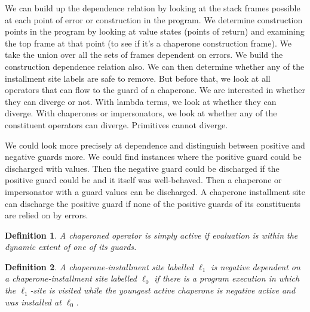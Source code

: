 \documentclass{sigplanconf}
\newtheorem{definition}{Definition}
\begin{document}
We can build up the dependence relation by looking at the stack frames possible at each point of error or construction in the program.
We determine construction points in the program by looking at value states (points of return) and examining the top frame at that point (to see if it's a chaperone construction frame).
We take the union over all the sets of frames dependent on errors.
We build the construction dependence relation also.
We can then determine whether any of the installment site labels are safe to remove.
But before that, we look at all operators that can flow to the guard of a chaperone.
We are interested in whether they can diverge or not.
With lambda terms, we look at whether they can diverge.
With chaperones or impersonators, we look at whether any of the constituent operators can diverge.
Primitives cannot diverge.

We could look more precisely at dependence and distinguish between positive and negative guards more.
We could find instances where the positive guard could be discharged with values. Then the negative guard could be discharged if the positive guard could be and it itself was well-behaved.
Then a chaperone or impersonator with a guard values can be discharged.
A chaperone installment site can discharge the positive guard if none of the positive guards of its constituents are relied on by errors.




\begin{definition}
A chaperoned operator is simply \emph{active} if evaluation is within the dynamic extent of one of its guards.
\end{definition}

\begin{definition}
A chaperone-installment site labelled $\ell_1$ is \emph{negative dependent} on a chaperone-installment site labelled $\ell_0$ if there is a program execution in which the $\ell_1$-site is visited while the youngest active chaperone is negative active and was installed at $\ell_0$.
\end{definition}
\end{document}
